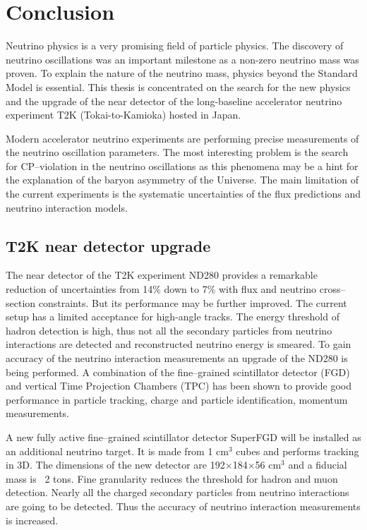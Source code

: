 \documentclass[./main.tex]{subfiles}
\begin{document}
\chapter*{Conclusion}

Neutrino physics is a very promising field of particle physics. The discovery of neutrino oscillations was an important milestone as a non-zero neutrino mass was proven. To explain the nature of the neutrino mass, physics beyond the Standard Model is essential. This thesis is concentrated on the search for the new physics and the upgrade of the near detector of the long-baseline accelerator neutrino experiment T2K (Tokai-to-Kamioka) hosted in Japan.

Modern accelerator neutrino experiments are performing precise measurements of the neutrino oscillation parameters. The most interesting problem is the search for CP--violation in the neutrino oscillations as this phenomena may be a hint for the explanation of the baryon asymmetry of the Universe. The main limitation of the current experiments is the systematic uncertainties of the flux predictions and neutrino interaction models.
\setcounter{section}{0}
\section{T2K near detector upgrade}
The near detector of the T2K experiment ND280 provides a remarkable reduction of uncertainties from 14\% down to 7\% with flux and neutrino cross--section constraints. But its performance may be further improved. The current setup has a limited acceptance for high-angle tracks. The energy threshold of hadron detection is high, thus not all the secondary particles from neutrino interactions are detected and reconstructed neutrino energy is smeared. To gain accuracy of the neutrino interaction measurements an upgrade of the ND280 is being performed. A combination of the fine--grained scintillator detector (FGD) and vertical Time Projection Chambers (TPC) has been shown to provide good performance in particle tracking, charge and particle identification, momentum measurements.

A new fully active fine--grained scintillator detector SuperFGD will be installed as an additional neutrino target. It is made from 1 cm${}^3$ cubes and performs tracking in 3D. The dimensions of the new detector are 192$\times$184$\times$56 cm${}^3$ and a fiducial mass is ~2 tons. Fine granularity reduces the threshold for hadron and muon detection. Nearly all the charged secondary particles from neutrino interactions are going to be detected. Thus the accuracy of neutrino interaction measurements is increased.
\end{document}
